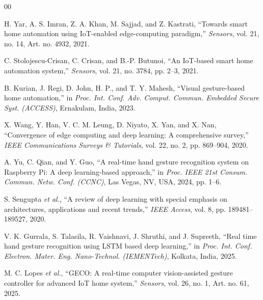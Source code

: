 \begin{thebibliography}{00}

H. Yar, A. S. Imran, Z. A. Khan, M. Sajjad, and Z. Kastrati, ``Towards smart home automation using IoT-enabled edge-computing paradigm,'' \textit{Sensors}, vol. 21, no. 14, Art. no. 4932, 2021.

C. Stolojescu-Crisan, C. Crisan, and B.-P. Butunoi, ``An IoT-based smart home automation system,'' \textit{Sensors}, vol. 21, no. 3784, pp. 2--3, 2021.

B. Kurian, J. Regi, D. John, H. P., and T. Y. Mahesh, ``Visual gesture-based home automation,'' in \textit{Proc. Int. Conf. Adv. Comput. Commun. Embedded Secure Syst. (ACCESS)}, Ernakulam, India, 2023.

X. Wang, Y. Han, V. C. M. Leung, D. Niyato, X. Yan, and X. Nan, ``Convergence of edge computing and deep learning: A comprehensive survey,'' \textit{IEEE Communications Surveys \& Tutorials}, vol. 22, no. 2, pp. 869--904, 2020.

A. Yu, C. Qian, and Y. Guo, ``A real-time hand gesture recognition system on Raspberry Pi: A deep learning-based approach,'' in \textit{Proc. IEEE 21st Consum. Commun. Netw. Conf. (CCNC)}, Las Vegas, NV, USA, 2024, pp. 1--6.

S. Sengupta \textit{et al.}, ``A review of deep learning with special emphasis on architectures, applications and recent trends,'' \textit{IEEE Access}, vol. 8, pp. 189481--189527, 2020.

V. K. Gurrala, S. Talasila, R. Vaishnavi, J. Shruthi, and J. Supreeth, ``Real time hand gesture recognition using LSTM based deep learning,'' in \textit{Proc. Int. Conf. Electron. Mater. Eng. Nano-Technol. (IEMENTech)}, Kolkata, India, 2025.

M. C. Lopes \textit{et al.}, ``GECO: A real-time computer vision-assisted gesture controller for advanced IoT home system,'' \textit{Sensors}, vol. 26, no. 1, Art. no. 61, 2025.


\end{thebibliography}
